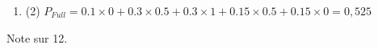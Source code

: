 \documentclass[a4paper, 10pt]{article}
\begin{document}
\begin{enumerate}[Q1]
\begin{enumerate}[a]
      \item (2) $ P_{\mathit{Full}}= 0.1\times0 + 0.3\times0.5 + 0.3\times1 + 0.15\times0.5 + 0.15\times0 = 0,525$
      \end{enumerate}
    \end{enumerate}

    Note sur 12.
    
\end{document}
